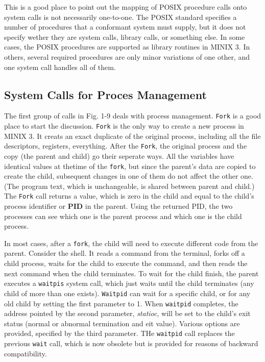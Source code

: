 \documentclass{book}
\newcommand {\kw}  [1] {\textbf{#1}}
\newcommand {\sys} [1] {\textsl{#1}}
\newcommand {\cmd} [1] {\texttt{#1}}
\begin{document}
This is a good place to point out the mapping of POSIX procedure calls onto system calls is not necessarily one-to-one.
The POSIX standard specifies a number of procedures that a conformant system must supply, 
but it does not specify wether they are system calls, library calls, or something else.
In some cases, the POSIX procedures are supported as library routines in MINIX 3.
In others, several required procedures are only minor variations of one other, and one system call handles all of them.

\subsection{System Calls for Proces Management}
The first group of calls in Fig. 1-9 deals with process management.
\cmd{Fork} is a good place to start the discussion.
\cmd{Fork} is the only way to create a new process in MINIX 3.
It creats an exact duplicate of the original process, including all the file descriptors, registers, everything.
After the \cmd{Fork}, the original process and the copy (the parent and child) go their seperate ways.
All the variables have identical values at thetime of the \cmd{fork}, but since the parent's data are copied to create the child, 
subsequent changes in one of them do not affect the other one.
(The program text, which is unchangeable, is shared between parent and child.)
The \cmd{Fork} call returns a value, which is zero in the child and equal to the child's process identifier or \kw{PID} in the parent.
Using the returned PID, the two processes can see which one is the parent process and which one is the child process.

In most cases, after a \cmd{fork}, the child will need to execute different code from the parent.
Consider the shell.
It reads a command from the terminal, forks off a child process, waits for the child to execute the command, 
and then reads the next command when the child terminates.
To wait for the child finish, the parent executes a \cmd{waitpis} system call, 
which just waits until the child terminates (any child of more than one exists).
\cmd{Waitpid} can wait for a specific child, or for any old child by setting the first parameter to 1.
When \cmd{waitpid} completes, the address pointed by the second parameter, \sys{statioc}, 
will be set to the child's exit status (normal or abnormal termination and eit value).
Various options are provided, specified by the third parameter.
THe \cmd{waitpid} call replaces the previous \cmd{wait} call, which is now obsolete but is provided for reasons of backward compatibility.
\end{document}
